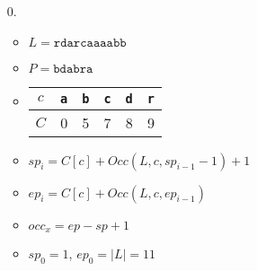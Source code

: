 \begin{enumerate}
\item[0.] \begin{itemize}
	\item $L = \texttt{rdarcaaaabb}$
	\item $P = \texttt{bdabra}$
	\item
		\begin{tabular}{c|ccccc}
		$c$	&\texttt{a}	&\texttt{b}	&\texttt{c}	&\texttt{d}	&\texttt{r}	\\\hline
		$C$	&0			&5			&7			&8			&9			\\
		\end{tabular}
	\item $sp_i = C[c] + Occ(L, c, sp_{i-1}-1)+1$
	\item $ep_i = C[c] + Occ(L, c, ep_{i-1})$
	\item $occ_x = ep - sp + 1$
	\item $sp_0 = 1$, $ep_0 = \left| L \right| = 11$
	\end{itemize}
\end{enumerate}
